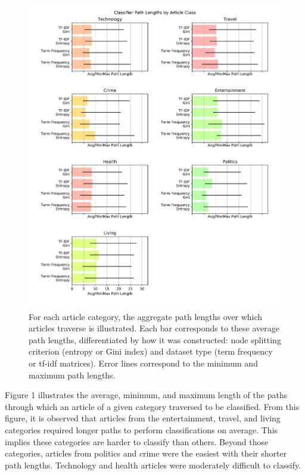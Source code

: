 \documentclass[11pt]{article}
\begin{document}

\begin{figure}[h!] \label{fig:pathlengths}
  \centering
  \includegraphics[width=\textwidth]{figures/decision_tree/mrmr/path_depths}
  \caption{For each article category, the aggregate path lengths over which articles traverse is illustrated.
  Each bar corresponds to these average path lengths, differentiated by how it was constructed: node splitting criterion (entropy or Gini index) and dataset type (term frequency or tf-idf matrices).
  Error lines correspond to the minimum and maximum path lengths.}
\end{figure}


Figure 1 illustrates the average, minimum, and maximum length of the paths through which an article of a given category traversed to be classified.
From this figure, it is observed that articles from the entertainment, travel, and living categories required longer paths to perform classifications on average.
This implies these categories are harder to classify than others.
Beyond those categories, articles from politics and crime were the easiest with their shorter path lengths.
Technology and health articles were moderately difficult to classify.
\end{document}
